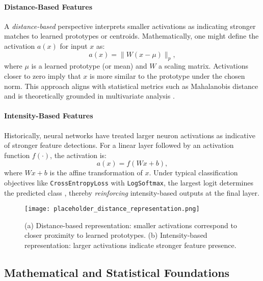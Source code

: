 \paragraph{Distance-Based Features}
A \emph{distance-based} perspective interprets smaller activations as indicating stronger matches to learned prototypes or centroids. Mathematically, one might define the activation $a(x)$ for input $x$ as:
\begin{equation}
    a(x) = \|W(x - \mu)\|_p,
    \label{eq:distance-based}
\end{equation}
where $\mu$ is a learned prototype (or mean) and $W$ a scaling matrix. Activations closer to zero imply that $x$ is more similar to the prototype under the chosen norm. This approach aligns with statistical metrics such as Mahalanobis distance and is theoretically grounded in multivariate analysis \cite{bishop2006pattern}.

\paragraph{Intensity-Based Features}
Historically, neural networks have treated larger neuron activations as indicative of stronger feature detections. For a linear layer followed by an activation function $f(\cdot)$, the activation is:
\begin{equation}
    a(x) = f(Wx + b),
    \label{eq:intensity-based}
\end{equation}
where $Wx + b$ is the affine transformation of $x$. Under typical classification objectives like \texttt{CrossEntropyLoss} with \texttt{LogSoftmax}, the largest logit determines the predicted class \cite{goodfellow2016deep}, thereby \emph{reinforcing} intensity-based outputs at the final layer.

\begin{figure}[ht]
    \centering
    \texttt{[image: placeholder\_distance\_representation.png]}
    \caption{(a) Distance-based representation: smaller activations correspond to closer proximity to learned prototypes. 
    (b) Intensity-based representation: larger activations indicate stronger feature presence.}
    \label{fig:distance_representation}
\end{figure}

\subsection{Mathematical and Statistical Foundations}

